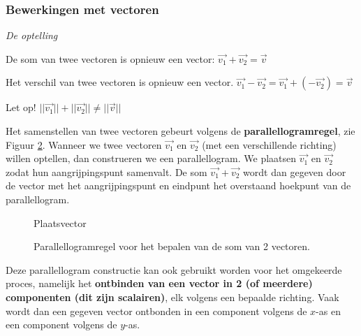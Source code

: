 \subsubsection{Bewerkingen met vectoren}

\emph{De optelling}

\begin{definitie}
De som van twee vectoren is opnieuw een vector: $\vec{v_1}+\vec{v_2}=\vec{v}$

Het verschil van twee vectoren is opnieuw een vector. $\vec{v_1}-\vec{v_2}=\vec{v_1}+(-\vec{v_2})=\vec{v}$
\end{definitie}

\begin{opmerking}
	Let op! $||\vec{v_1}||+||\vec{v_2}|| \ne ||\vec{v}||$
\end{opmerking}

Het samenstellen van twee vectoren gebeurt volgens de \textbf{parallellogramregel}, zie Figuur \ref{fig:som_par}. Wanneer we twee vectoren $\vec{v_1}$ en $\vec{v_2}$ (met een verschillende richting) willen optellen, dan construeren we een parallellogram. We plaatsen $\vec{v_1}$ en $\vec{v_2}$ zodat hun aangrijpingspunt samenvalt. De som $\vec{v_1}+\vec{v_2}$ wordt dan gegeven door de vector met het aangrijpingspunt en eindpunt het overstaand hoekpunt van de parallellogram.


\begin{figure}[H]
	\centering	
	
	\caption{Plaatsvector}
	\label{fig:plaatsvector}
\end{figure}




\begin{figure}[H]
	\centering	

	\caption{Parallellogramregel voor het bepalen van de som van 2 vectoren.}
	\label{fig:som_par}
\end{figure}


 
 

Deze parallellogram constructie kan ook gebruikt worden voor het omgekeerde proces, namelijk het \textbf{ontbinden van een vector in 2 (of meerdere) componenten (dit zijn scalairen)}, elk volgens een bepaalde richting. Vaak wordt dan een gegeven vector ontbonden in een component volgens de $x$-as en een component volgens de $y$-as.



